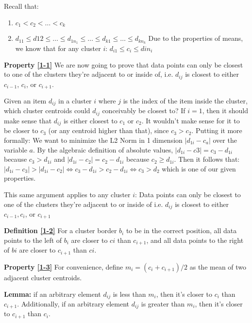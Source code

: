 \documentclass[conference]{IEEEtran}
\begin{document}
Recall that:
\begin{enumerate}
\item $c_1 < c_2 < \dots < c_k$
\item $d_{11} \leq d12 \leq \dots \leq d_{1n_1} \leq \dots \leq d_{k1} \leq \dots \leq d_{kn_k}$
Due to the properties of means, we know that for any cluster $i$:
$d_{i1} \leq c_i \leq din_i$
\end{enumerate}

\textbf{Property \ref{1-1}}
We are now going to prove that data points can only be closest to one of the clusters they’re adjacent to or inside of,
i.e. $d_{ij}$ is closest to either $c_{i-1}$, $c_i$, or $c_{i+1}$.

Given an item $d_{ij}$ in a cluster $i$ where $j$ is the index of the item inside the cluster, which cluster centroids could $d_{ij}$ conceivably be closest to?
If $i=1$, then it should make sense that $d_{ij}$ is either closest to $c_1$ or $c_2$. It wouldn’t make sense for it to be closer to $c_3$ (or any centroid higher than that), since $c_3 > c_2$.
Putting it more formally: We want to minimize the L2 Norm in 1 dimension $|d_{1i} - c_a|$ over the variable $a$.
By the algebraic definition of absolute values, $|d_{1i}-c3| = c_3-d_{1i}$ because $c_3 > d_{1i}$ and $|d_{1i}-c_2| = c_2-d_{1i}$ because $c_2 \geq d_{1i}$.
Then it follows that:
$|d_{1i} - c_3| > |d_{1i} - c_2| \iff c_3 - d_{1i} > c_2 - d_{1i} \iff c_3 > d_2$ which is one of our given properties.

This same argument applies to any cluster $i$: Data points can only be closest to one of the clusters they’re adjacent to or inside of
i.e. $d_{ij}$ is closest to either $c_{i-1}, c_i$, or $c_{i+1}$

\textbf{Definition \ref{1-2}}
For a cluster border $b_i$ to be in the correct position, all data points to the left of $b_i$ are closer to $ci$ than $c_{i+1}$, and all data points to the right of $bi$ are closer to $c_{i+1}$ than $ci$.

\textbf{Property \ref{1-3}}
For convenience, define $m_i = (c_i+c_{i+1})/2$ as the mean of two adjacent cluster centroids.

\textbf{Lemma:}
if an arbitrary element $d_{ij}$ is less than $m_i$, then it’s closer to $c_i$ than $c_{i+1}$.
Additionally, if an arbitrary element $d_{ij}$ is greater than $m_i$, then it’s closer to $c_{i+1}$ than $c_i$.
\end{document}
